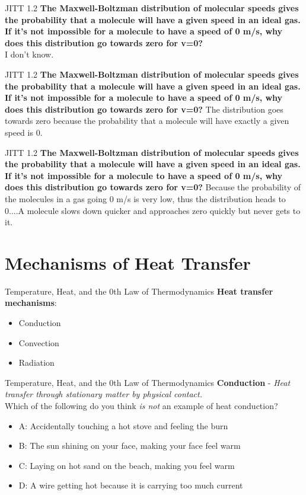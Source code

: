 \documentclass{beamer}
\begin{document}
\begin{frame}{JITT 1.2}
\textbf{The Maxwell-Boltzman distribution of molecular speeds gives the probability that a molecule will have a given speed in an ideal gas.  If it's not impossible for a molecule to have a speed of 0 m/s, why does this distribution go towards zero for v=0?} \\
I don’t know.
\end{frame}

\begin{frame}{JITT 1.2}
\textbf{The Maxwell-Boltzman distribution of molecular speeds gives the probability that a molecule will have a given speed in an ideal gas.  If it's not impossible for a molecule to have a speed of 0 m/s, why does this distribution go towards zero for v=0?}
The distribution goes towards zero because the probability that a molecule will have exactly a given speed is 0.
\end{frame}

\begin{frame}{JITT 1.2}
\textbf{The Maxwell-Boltzman distribution of molecular speeds gives the probability that a molecule will have a given speed in an ideal gas.  If it's not impossible for a molecule to have a speed of 0 m/s, why does this distribution go towards zero for v=0?}
Because the probability of the molecules in a gas going 0 m/s is very low, thus the distribution heads to 0....A molecule slows down quicker and approaches zero quickly but never gets to it.
\end{frame}

\section{Mechanisms of Heat Transfer}

\begin{frame}{Temperature, Heat, and the 0th Law of Thermodynamics}
\textbf{Heat transfer mechanisms}:
\begin{itemize}
\item Conduction
\item Convection
\item Radiation
\end{itemize}
\end{frame}

\begin{frame}{Temperature, Heat, and the 0th Law of Thermodynamics}
\textbf{Conduction} - \textit{Heat transfer through stationary matter by physical contact.} \\ \vspace{0.5cm}
Which of the following do you think \textit{is not} an example of heat conduction?
\begin{itemize}
\item A: Accidentally touching a hot stove and feeling the burn
\item B: The sun shining on your face, making your face feel warm
\item C: Laying on hot sand on the beach, making you feel warm
\item D: A wire getting hot because it is carrying too much current
\end{itemize}
\end{frame}
\end{document}
